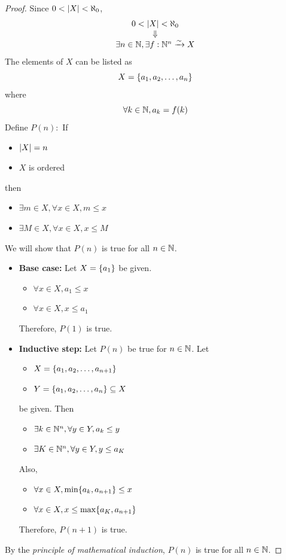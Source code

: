 \begin{proof}
    Since $0 < \abs*{X} < \aleph_{0}$,
    \[
    \begin{array}{c}
        0 < \abs*{X} < \aleph_{0} \\
        \Downarrow \\
        \exists n \in \N, \exists f: \N^{n} \xrightarrow{\sim} X
    \end{array}
    \]
    The elements of $X$ can be listed as
    \[
    X = \set*{a_{1}, a_{2}, \dots, a_{n}}
    \]
    where
    \[
    \forall k \in \N, a_{k} = f(k)
    \]
    Define $P(n):$ If
    \begin{itemize}
        \item $\abs*{X} = n$
        \item $X$ is ordered
    \end{itemize}
    then
    \begin{itemize}
        \item $\exists m \in X, \forall x \in X, m \leq x$
        \item $\exists M \in X, \forall x \in X, x \leq M$
    \end{itemize}
    We will show that $P(n)$ is true for all $n \in \N$.
    \begin{itemize}
        \item \textbf{Base case:} Let $X = \set*{a_{1}}$ be given.
        \begin{itemize}
            \item $\forall x \in X, a_{1} \leq x$
            \item $\forall x \in X, x \leq a_{1}$
        \end{itemize}
        Therefore, $P(1)$ is true.
        \item \textbf{Inductive step:} Let $P(n)$ be true for $n \in \N$. Let
        \begin{itemize}
            \item $X = \set*{a_{1}, a_{2}, \dots, a_{n + 1}}$
            \item $Y = \set*{a_{1}, a_{2}, \dots, a_{n}} \subseteq X$
        \end{itemize}
        be given. Then
        \begin{itemize}
            \item $\exists k \in \N^{n}, \forall y \in Y, a_{k} \leq y$
            \item $\exists K \in \N^{n}, \forall y \in Y, y \leq a_{K}$
        \end{itemize}
        Also,
        \begin{itemize}
            \item $\forall x \in X, \min\set*{{a_{k}, a_{n + 1}}} \leq x$
            \item $\forall x \in X, x \leq \max\set*{{a_{K}, a_{n + 1}}}$
        \end{itemize}
        Therefore, $P(n + 1)$ is true.
    \end{itemize}
    By the \emph{principle of mathematical induction}, $P(n)$ is true for all $n \in \N$.
\end{proof}

